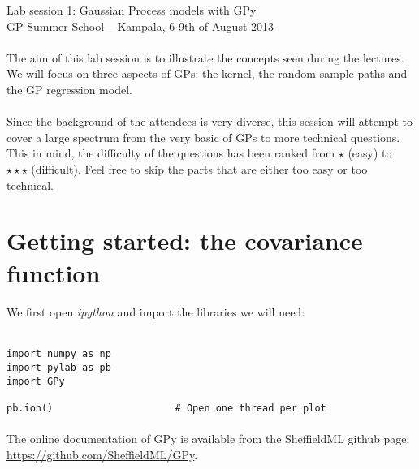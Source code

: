 \documentclass{article}
\begin{document}
\begin{center}
\textcolor{MyDarkBlue}{
{\LARGE Lab session 1: Gaussian Process models with GPy\\}
\vspace*{.5cm}
{\large GP Summer School -- Kampala, 6-9th of August 2013}
}
\end{center}
\vspace*{1cm}

\paragraph{}
The aim of this lab session is to illustrate the concepts seen during the lectures. We will focus on three aspects of GPs: the kernel, the random sample paths and the GP regression model. 

\paragraph{}
Since the background of the attendees is very diverse, this session will attempt to cover a large spectrum from the very basic of GPs to more technical questions. This in mind, the difficulty of the questions has been ranked from $\star$ (easy) to $\star \star \star$ (difficult). Feel free to skip the parts that are either too easy or too technical.

\section{Getting started: the covariance function}
\paragraph{}
We first open \textit{ipython} and import the libraries we will need: \\ \ \\
\begin{verbatim}
import numpy as np
import pylab as pb
import GPy

pb.ion()                     # Open one thread per plot
\end{verbatim}

\paragraph{}
The online documentation of GPy is available from the SheffieldML github page:
\url{https://github.com/SheffieldML/GPy}.
\end{document}
